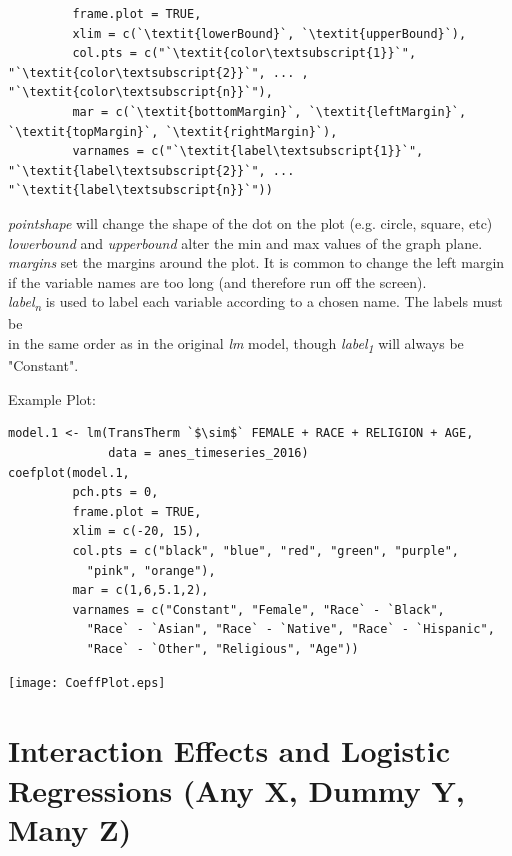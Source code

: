 \documentclass[12pt,letterpaper]{article}
\newcommand{\ind}{\phantom{AA}}
\begin{document}
\begin{tcolorbox}[title = Coefficient Plots (cont.)]
\begin{lstlisting}
         frame.plot = TRUE, 
         xlim = c(`\textit{lowerBound}`, `\textit{upperBound}`), 
         col.pts = c("`\textit{color\textsubscript{1}}`", "`\textit{color\textsubscript{2}}`", ... , "`\textit{color\textsubscript{n}}`"), 
         mar = c(`\textit{bottomMargin}`, `\textit{leftMargin}`, `\textit{topMargin}`, `\textit{rightMargin}`), 
         varnames = c("`\textit{label\textsubscript{1}}`", "`\textit{label\textsubscript{2}}`", ... "`\textit{label\textsubscript{n}}`"))
\end{lstlisting}
\textit{pointshape} will change the shape of the dot on the plot (e.g. circle, square, etc)\\
\textit{lowerbound} and \textit{upperbound} alter the min and max values of the graph plane.\\
\textit{margins} set the margins around the plot. It is common to change the left margin \\ \ind if the variable names are too long (and therefore run off the screen).\\
\textit{label\textsubscript{n}} is used to label each variable according to a chosen name. The labels must be  \\ \ind in the same order as in the original \textit{lm} model, though \textit{label\textsubscript{1}} will always be \\ \ind  "Constant".
\end{tcolorbox}

\begin{tcolorbox}[title = Coefficient Plots (cont.)]
Example Plot:
\begin{lstlisting}
model.1 <- lm(TransTherm `$\sim$` FEMALE + RACE + RELIGION + AGE, 
              data = anes_timeseries_2016)
coefplot(model.1, 
         pch.pts = 0, 
         frame.plot = TRUE, 
         xlim = c(-20, 15), 
         col.pts = c("black", "blue", "red", "green", "purple", 
           "pink", "orange"), 
         mar = c(1,6,5.1,2), 
         varnames = c("Constant", "Female", "Race` - `Black", 
           "Race` - `Asian", "Race` - `Native", "Race` - `Hispanic", 
           "Race` - `Other", "Religious", "Age"))
\end{lstlisting}
\begin{center}
\texttt{[image: CoeffPlot.eps]}
\end{center}
\end{tcolorbox}

\section{Interaction Effects and Logistic Regressions (Any X, Dummy Y, Many Z)}
\end{document}
